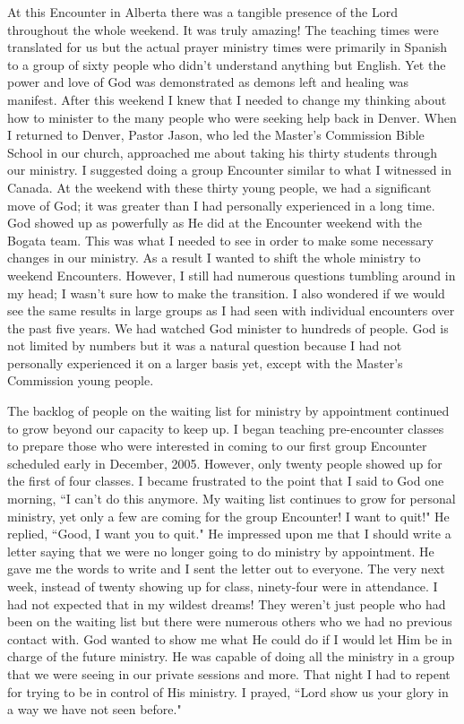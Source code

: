 \documentclass[oneside]{book}
\begin{document}
At this Encounter in Alberta there was a tangible presence of the Lord throughout the whole weekend. It was truly amazing! The teaching times were translated for us but the actual prayer ministry times were primarily in Spanish to a group of sixty people who didn't understand anything but English. Yet the power and love of God was demonstrated as demons left and healing was manifest. After this weekend I knew that I needed to change my thinking about how to minister to the many people who were seeking help back in Denver. When I returned to Denver, Pastor Jason, who led the Master's Commission Bible School in our church, approached me about taking his thirty students through our ministry.  I suggested doing a group Encounter similar to what I witnessed in Canada. At the weekend with these thirty young people, we had a significant move of God; it was greater than I had personally experienced in a long time. God showed up as powerfully as He did at the Encounter weekend with the Bogata team. This was what I needed to see in order to make some necessary changes in our ministry. As a result I wanted to shift the whole ministry to weekend Encounters. However, I still had numerous questions tumbling around in my head; I wasn't sure how to make the transition. I also wondered if we would see the same results in large groups as I had seen with individual encounters over the past five years. We had watched God minister to hundreds of people. God is not limited by numbers but it was a natural question because I had not personally experienced it on a larger basis yet, except with the Master's Commission young people.  

The backlog of people on the waiting list for ministry by appointment continued to grow beyond our capacity to keep up. I began teaching pre-encounter classes to prepare those who were interested in coming to our first group Encounter scheduled early in December, 2005. However, only twenty people showed up for the first of four classes. I became frustrated to the point that I said to God one morning, ``I can't do this anymore. My waiting list continues to grow for personal ministry, yet only a few are coming for the group Encounter! I want to quit!" He replied, ``Good, I want you to quit." He impressed upon me that I should write a letter saying that we were no longer going to do ministry by appointment.  He gave me the words to write and I sent the letter out to everyone. The very next week, instead of twenty showing up for class, ninety-four were in attendance. I had not expected that in my wildest dreams! They weren't just people who had been on the waiting list but there were numerous others who we had no previous contact with. God wanted to show me what He could do if I would let Him be in charge of the future ministry. He was capable of doing all the ministry in a group that we were seeing in our private sessions and more. That night I had to repent for trying to be in control of His ministry. I prayed, ``Lord show us your glory in a way we have not seen before." 
\end{document}
